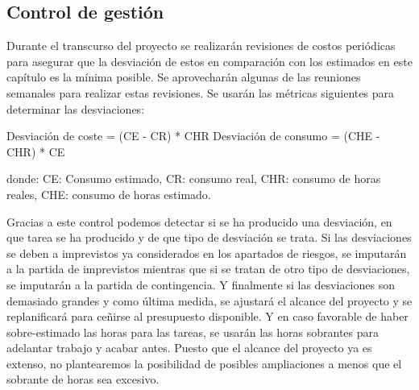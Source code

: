 \subsection{Control de gestión}
Durante el transcurso del proyecto se realizarán revisiones de costos periódicas para asegurar que la desviación de estos en comparación con los estimados en este capítulo es la mínima posible. Se aprovecharán algunas de las reuniones semanales para realizar estas revisiones. Se usarán las métricas siguientes para determinar las desviaciones:

Desviación de coste = (CE - CR) * CHR  
Desviación de consumo = (CHE - CHR) * CE  

donde: CE: Consumo estimado, CR: consumo real, CHR: consumo de horas reales, CHE: consumo de horas estimado.  

Gracias a este control podemos detectar si se ha producido una desviación, en que tarea se ha producido y de que tipo de desviación se trata. Si las desviaciones se deben a imprevistos ya considerados en los apartados de riesgos, se imputarán a la partida de imprevistos mientras que si se tratan de otro tipo de desviaciones, se imputarán a la partida de contingencia. Y finalmente si las desviaciones son demasiado grandes y como última medida, se ajustará el alcance del proyecto y se replanificará para ceñirse al presupuesto disponible. Y en caso favorable de haber sobre-estimado las horas para las tareas, se usarán las horas sobrantes para adelantar trabajo y acabar antes. Puesto que el alcance del proyecto ya es extenso, no plantearemos la posibilidad de posibles ampliaciones a menos que el sobrante de horas sea excesivo.